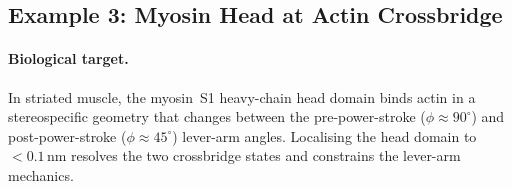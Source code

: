 \subsection{Example 3: Myosin Head at Actin Crossbridge}
\label{sec:ch06-example-myosin}

\paragraph{Biological target.}
In striated muscle, the myosin~S1 heavy-chain head domain binds actin in a
stereospecific geometry that changes between the pre-power-stroke
($\phi \approx 90^\circ$) and post-power-stroke ($\phi \approx 45^\circ$)
lever-arm angles.  Localising the head domain to $<0.1\,\text{nm}$ resolves
the two crossbridge states and constrains the lever-arm mechanics.

